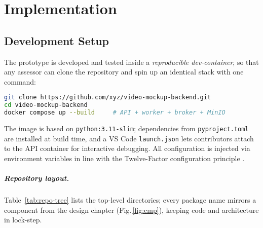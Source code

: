 \chapter{Implementation} \label{chap:implementation}

\section{Development Setup}
\label{sec:dev-setup}

The prototype is developed and tested inside a \emph{reproducible dev-container},
so that any assessor can clone the repository and spin up an identical stack
with one command:

\begin{lstlisting}[language=bash,basicstyle=\ttfamily\scriptsize]
git clone https://github.com/xyz/video-mockup-backend.git
cd video-mockup-backend
docker compose up --build     # API + worker + broker + MinIO
\end{lstlisting}

The image is based on \texttt{python:3.11-slim}; dependencies from
\texttt{pyproject.toml} are installed at build time, and a VS Code
\texttt{launch.json} lets contributors attach to the API container for
interactive debugging.  All configuration is injected via environment variables
in line with the Twelve-Factor configuration principle \cite{twelveFactor}.

\paragraph{Repository layout.}
Table~\ref{tab:repo-tree} lists the top-level directories; every package name
mirrors a component from the design chapter (Fig.\,\ref{fig:cmp}), keeping code
and architecture in lock-step.

